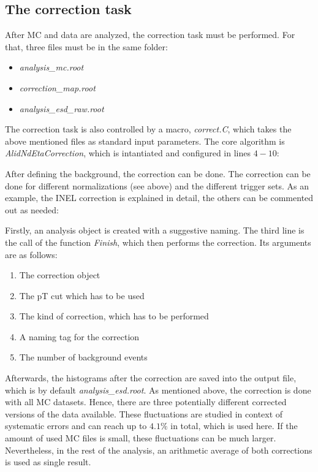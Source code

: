 \documentclass{article}
\begin{document}
\subsection{The correction task}
\label{subsec:correction}
After MC and data are analyzed, the correction task must be performed. For that, three files must be in the same folder:
\begin{itemize}
\item \textit{analysis\_mc.root}
\item \textit{correction\_map.root}
\item \textit{analysis\_esd\_raw.root}
\end{itemize}
The correction task is also controlled by a macro, \textit{correct.C}, which takes the above mentioned files as standard input parameters. The core algorithm is \textit{AlidNdEtaCorrection}, which is intantiated and configured in lines $4-10$:



After defining the background, the correction can be done. The correction can be done for different normalizations (see above) and the different trigger sets. As an example, the INEL correction is explained in detail, the others can be commented out as needed:

Firstly, an analysis object is created with a suggestive naming. The third line is the call of the function \textit{Finish}, which then performs the correction. Its arguments are as follows:
\begin{enumerate}
\item The correction object
\item The pT cut which has to be used
\item The kind of correction, which has to be performed
\item A naming tag for the correction
\item The number of background events
\end{enumerate}
Afterwards, the histograms after the correction are saved into the output file, which is by default \textit{analysis\_esd.root}. As mentioned above, the correction is done with all MC datasets. Hence, there are three potentially different corrected versions of the data available. These fluctuations are studied in context of systematic errors and can reach up to $4.1\%$ in total, which is used here. If the amount of used MC files is small, these fluctuations can be much larger. Nevertheless, in the rest of the analysis, an arithmetic average of both corrections is used as single result.
\end{document}
